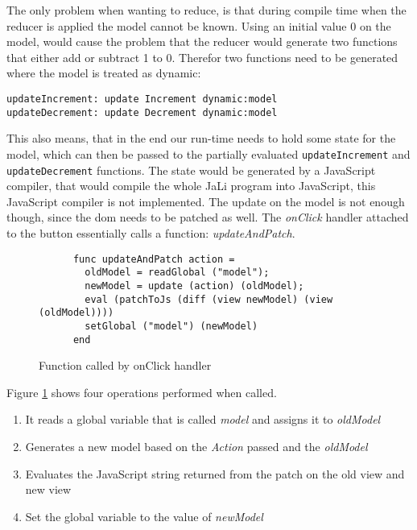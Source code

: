 The only problem when wanting to reduce, is that during compile time when the reducer is applied the model cannot be known. Using an initial value 0 on the model, would cause the problem that the reducer would generate two functions that either add or subtract 1 to 0. Therefor two functions need to be generated where the model is treated as dynamic:

\begin{verbatim}
updateIncrement: update Increment dynamic:model
updateDecrement: update Decrement dynamic:model
\end{verbatim}

This also means, that in the end our run-time needs to hold some state for the model, which can then be passed to the partially evaluated \texttt{updateIncrement} and \texttt{updateDecrement} functions.
The state would be generated by a JavaScript compiler, that would compile the whole JaLi program into JavaScript, this JavaScript compiler is not implemented. 
The update on the model is not enough though, since the \gls{dom} needs to be patched as well. The \textit{onClick} handler attached to the button essentially calls a function: \textit{updateAndPatch}.

\begin{figure}[H]
    \centering
    \begin{verbatim}
      func updateAndPatch action = 
        oldModel = readGlobal ("model");
        newModel = update (action) (oldModel);
        eval (patchToJs (diff (view newModel) (view (oldModel))))
        setGlobal ("model") (newModel)
      end
    \end{verbatim}
    \caption{Function called by onClick handler}
    \label{fig:updateAndPatch}
\end{figure}

Figure \ref{fig:updateAndPatch} shows four operations performed when called.
\begin{enumerate}
    \item It reads a global variable that is called \textit{model} and assigns it to \textit{oldModel}
    \item Generates a new model based on the \textit{Action} passed and the \textit{oldModel}
    \item Evaluates the JavaScript string returned from the patch on the old view and new view
    \item Set the global variable to the value of \textit{newModel}
\end{enumerate}

